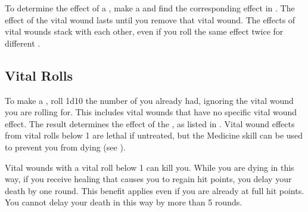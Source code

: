     To determine the effect of a , make a  and find the corresponding effect in .
    The effect of the vital wound lasts until you remove that vital wound.
    The effects of vital wounds stack with each other, even if you roll the same effect twice for different .

    \subsection{Vital Rolls}\label{Vital Rolls}
        To make a , roll 1d10 \sub the number of  you already had, ignoring the vital wound you are rolling for.
        This includes vital wounds that have no specific vital wound effect.
        The result determines the effect of the , as listed in .
        Vital wound effects from vital rolls below 1 are lethal if untreated, but the Medicine skill can be used to prevent you from dying (see ).

         Vital wounds with a vital roll below 1 can kill you.
        While you are dying in this way, if you receive healing that causes you to regain hit points, you delay your death by one round.
        This benefit applies even if you are already at full hit points.
        You cannot delay your death in this way by more than 5 rounds.

